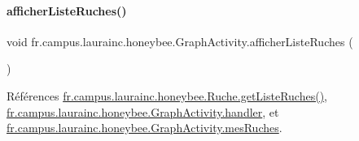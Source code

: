 \paragraph{\texorpdfstring{afficher\+Liste\+Ruches()}{afficherListeRuches()}}
{\footnotesize\ttfamily void fr.\+campus.\+laurainc.\+honeybee.\+Graph\+Activity.\+afficher\+Liste\+Ruches (\begin{DoxyParamCaption}{ }\end{DoxyParamCaption})\hspace{0.3cm}{\ttfamily [private]}}



Références \hyperlink{classfr_1_1campus_1_1laurainc_1_1honeybee_1_1_ruche_a7108fb412c0628d3966aa8c76fd9e2b7}{fr.\+campus.\+laurainc.\+honeybee.\+Ruche.\+get\+Liste\+Ruches()}, \hyperlink{classfr_1_1campus_1_1laurainc_1_1honeybee_1_1_graph_activity_ac42217c5db8be9ce814ab813e2d3080c}{fr.\+campus.\+laurainc.\+honeybee.\+Graph\+Activity.\+handler}, et \hyperlink{classfr_1_1campus_1_1laurainc_1_1honeybee_1_1_graph_activity_ac3cf2f6b767bd189dc5c85ecbb48d0f6}{fr.\+campus.\+laurainc.\+honeybee.\+Graph\+Activity.\+mes\+Ruches}.


